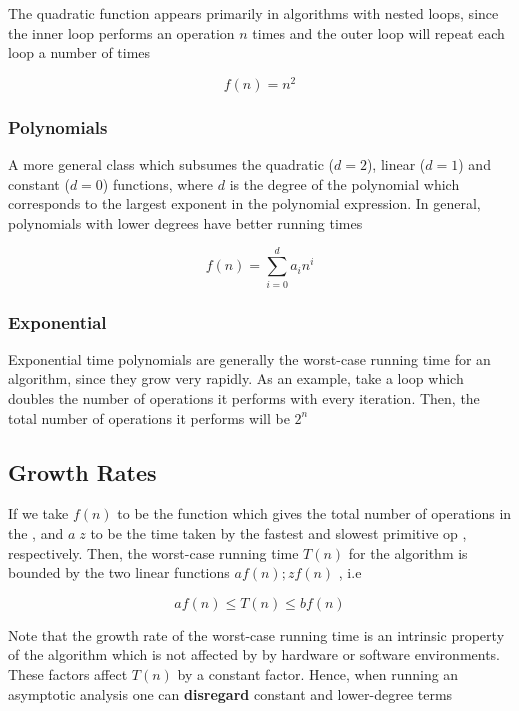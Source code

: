 	\par{The quadratic function appears primarily in algorithms with nested
			loops, since the inner loop performs an operation $n$ times and the
	outer loop will repeat each loop a  number of times}

	$$f(n) = n^2$$

\subsubsection{Polynomials}

\par{A more general class which subsumes the quadratic ($d=2$), linear ($d=1$)
		and constant ($d=0$) functions, where $d$ is the degree of the
		polynomial which corresponds to the largest exponent in the polynomial
		expression. In general, polynomials with lower degrees have better
running times}

$$f(n) = \sum_{i=0}^{d} a_{i}n^{i}$$

\subsubsection{Exponential}

	\par{Exponential time polynomials are generally the worst-case running time
			for an algorithm, since they grow very rapidly. As an example, take
			a loop which doubles the number of operations it performs with every
			iteration. Then, the total number of operations it performs will be
	$2^n$}


\subsection{Growth Rates}


	\par{If we take $f(n)$ to be the function which gives the total number of
			operations in the , and $a\;z$ to be the time taken
			by the fastest and slowest primitive op , respectively. Then, the
			worst-case running time $T(n)$ for the algorithm is bounded by the two
	linear functions $af(n);zf(n)$ , i.e}

	$$af(n) \leq T(n) \leq bf(n)$$

	\par{Note that the growth rate of the worst-case running time is an
			intrinsic property of the algorithm which is not affected by by
	hardware or software environments. These factors affect $T(n)$ by a constant
	factor. Hence, when running an asymptotic analysis one can \textbf{disregard} constant
	and lower-degree terms}

